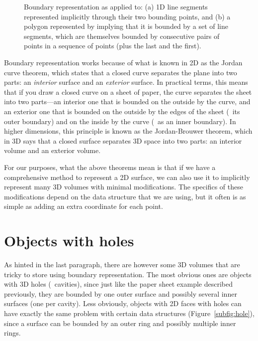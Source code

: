 \begin{figure}
\begin{subfigure}[b]{0.3\linewidth}
\caption{}%
\label{subfig:loop}
\end{subfigure}
\caption{Boundary representation as applied to: (a) 1D line segments represented implicitly through their two bounding points, and (b) a polygon represented by implying that it is bounded by a set of line segments, which are themselves bounded by consecutive pairs of points in a sequence of points (plus the last and the first).}%
\label{fig:brep}
\end{figure}

Boundary representation works because of what is known in 2D as the Jordan curve theorem, which states that a closed curve separates the plane into two parts: an \emph{interior} surface and an \emph{exterior} surface.
In practical terms, this means that if you draw a closed curve on a sheet of paper, the curve separates the sheet into two parts---an interior one that is bounded on the outside by the curve, and an exterior one that is bounded on the outside by the edges of the sheet (\ie\ its outer boundary) and on the inside by the curve (\ie\ as an inner boundary).
In higher dimensions, this principle is known as the Jordan-Brouwer theorem, which in 3D says that a closed surface separates 3D space into two parts: an interior volume and an exterior volume.

For our purposes, what the above theorems mean is that if we have a comprehensive method to represent a 2D surface, we can also use it to implicitly represent many 3D volumes with minimal modifications.
The specifics of these modifications depend on the data structure that we are using, but it often is as simple as adding an extra coordinate for each point.

\section{Objects with holes}

As hinted in the last paragraph, there are however some 3D volumes that are tricky to store using boundary representation.
The most obvious ones are objects with 3D holes (\ie\ cavities), since just like the paper sheet example described previously, they are bounded by one outer surface and possibly several inner surfaces (one per cavity).
Less obviously, objects with 2D faces with holes can have exactly the same problem with certain data structures (Figure~\ref{subfig:hole}), since a surface can be bounded by an outer ring and possibly multiple inner rings.

